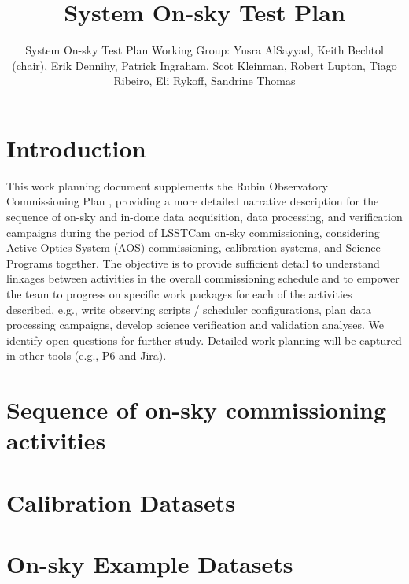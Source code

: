 \documentclass[SE,authoryear,toc,lsstdraft]{lsstdoc}
\title{System On-sky Test Plan}
\author{%
System On-sky Test Plan Working Group: Yusra AlSayyad, Keith Bechtol (chair), Erik Dennihy, Patrick Ingraham, Scot Kleinman, Robert Lupton, Tiago Ribeiro, Eli Rykoff, Sandrine Thomas
}
\date{\vcsDate}
\begin{document}
\maketitle


\section{Introduction}

This work planning document supplements the Rubin Observatory Commissioning Plan , providing a more detailed narrative description for the sequence of on-sky and in-dome data acquisition, data processing, and verification campaigns during the period of LSSTCam on-sky commissioning, considering Active Optics System (AOS) commissioning, calibration systems, and Science Programs together.
The objective is to provide sufficient detail to understand linkages between activities in the overall commissioning schedule and to empower the team to progress on specific work packages for each of the activities described, e.g., write observing scripts / scheduler configurations, plan data processing campaigns, develop science verification and validation analyses.
We identify open questions for further study.
Detailed work planning will be captured in other tools (e.g., P6 and Jira).

\section{Sequence of on-sky commissioning activities}

\section{Calibration Datasets}



\section{On-sky Example Datasets}
\end{document}
